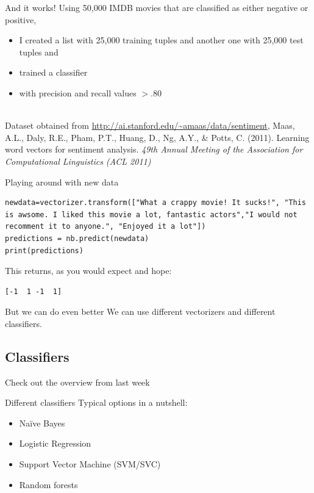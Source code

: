 \documentclass[compress]{beamer}
\begin{document}
\begin{frame}{And it works!}
	Using 50,000 IMDB movies that are classified as either negative or positive,
	\begin{itemize}
		\item I created a list with 25,000 training tuples and another one with 25,000 test tuples and
		\item trained a classifier
		\item with precision and recall values $>.80$
	\end{itemize}
	~\\
	\tiny{Dataset obtained from \url{http://ai.stanford.edu/~amaas/data/sentiment}, Maas, A.L., Daly, R.E., Pham, P.T., Huang, D., Ng, A.Y., \& Potts, C. (2011). Learning word vectors for sentiment analysis. \emph{49th Annual Meeting of the Association for Computational Linguistics (ACL 2011)}
	}
	
\end{frame}

\begin{frame}[fragile]{Playing around with new data}
\begin{lstlisting}
newdata=vectorizer.transform(["What a crappy movie! It sucks!", "This is awsome. I liked this movie a lot, fantastic actors","I would not recomment it to anyone.", "Enjoyed it a lot"])
predictions = nb.predict(newdata)
print(predictions)
\end{lstlisting}
This returns, as you would expect and hope:
\begin{lstlisting} 
[-1  1 -1  1]
\end{lstlisting}


\end{frame}




\begin{frame}{But we can do even better}
	We can use different vectorizers and different classifiers.
\end{frame}


\subsection{Classifiers}

\begin{frame}[standout]
	Check out the overview from last week
\end{frame}

\begin{frame}{Different classifiers}
	Typical options in a nutshell:
	\begin{itemize}
		\item Na\"ive Bayes
		\item Logistic Regression
		\item Support Vector Machine (SVM/SVC)
		\item Random forests
	\end{itemize}
\end{frame}
\end{document}
